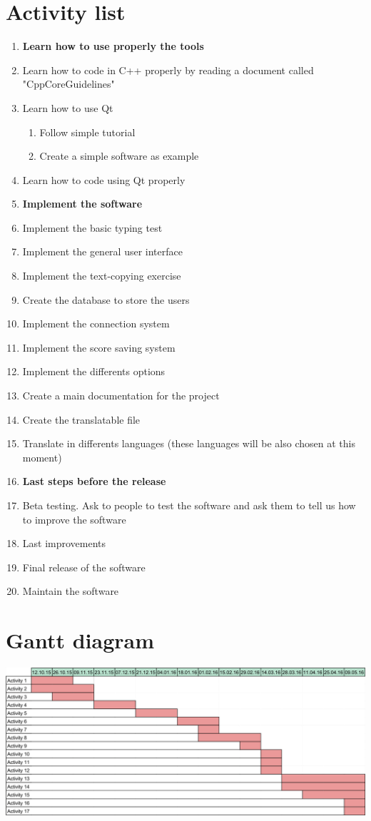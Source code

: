 \chapter{Activity list}
\begin{enumerate}
	\item[]\textbf{Learn how to use properly the tools}
	\item Learn how to code in C++ properly by reading a document called "CppCoreGuidelines"
	\item Learn how to use Qt 
	\begin{enumerate}
		\item Follow simple tutorial
		\item Create a simple software as example
	\end{enumerate} 
	\item Learn how to code using Qt properly
	\item[]\textbf{Implement the software}
	\item Implement the basic typing test
	\item Implement the general user interface
	\item Implement the text-copying exercise
	\item Create the database to store the users
	\item Implement the connection system
	\item Implement the score saving system
	\item Implement the differents options
	\item Create a main documentation for the project
	\item Create the translatable file
	\item Translate in differents languages (these languages will be also chosen at this moment)
	\item[]\textbf{Last steps before the release}
	\item Beta testing. Ask to people to test the software and ask them to tell us how to improve the software
	\item Last improvements
	\item Final release of the software
	\item Maintain the software
\end{enumerate}

\chapter{Gantt diagram}
\begin{center}
\includegraphics[scale=0.23]{./images/Gantt.png}
\end{center}


